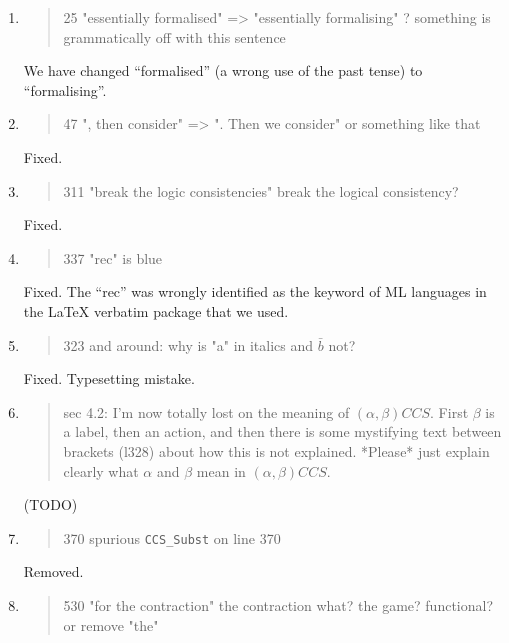 \begin{enumerate}
  \item \begin{quote}
25 "essentially formalised" => "essentially formalising" ? something is grammatically off with this sentence
\end{quote}
  \Mark We have changed ``formalised'' (a wrong use of the past tense) to ``formalising''. 

  \item \begin{quote}
47 ", then consider" => ". Then we consider" or something like that
\end{quote}
  \Mark Fixed.

  \item \begin{quote}
311 "break the logic consistencies" break the logical consistency?
\end{quote}
  \Mark Fixed.

  \item \begin{quote}
337 "rec" is blue
\end{quote}
  \Mark Fixed. The ``rec'' was wrongly identified as the keyword of ML
  languages in the \LaTeX{} verbatim package that we used.

  \item \begin{quote}
323 and around: why is "a" in italics and $\bar{b}$ not?
\end{quote}
  \Mark Fixed. Typesetting mistake.

  \item \begin{quote}
sec 4.2: I'm now totally lost on the meaning of $(\alpha, \beta) CCS$. First $\beta$ is a label, then an action, and then there is some mystifying text between brackets (l328) about how this is not explained. *Please* just explain clearly what $\alpha$ and $\beta$ mean in $(\alpha, \beta) CCS$. 
\end{quote}
  \Mark (TODO)

  \item \begin{quote}
370 spurious \texttt{CCS_Subst} on line 370
\end{quote}
  \Mark Removed.

  \item \begin{quote}
530 "for the contraction" the contraction what? the game? functional? or remove "the"
\end{quote}
  \Mark


\end{enumerate}
